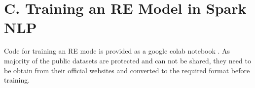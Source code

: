 \documentclass[letterpaper]{article}
\begin{document}
\section{C. Training an RE Model in Spark NLP}
Code for training an RE mode is provided as a google colab notebook \cite{re_training_code}. As majority of the public datasets are protected and can not be shared, they need to be obtain from their official websites and converted to the required format before training.




























\newpage

\end{document}
